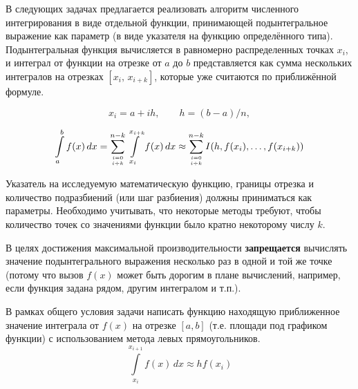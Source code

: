 
В следующих задачах предлагается реализовать алгоритм численного 
интегрирования в виде отдельной функции, принимающей подынтегральное выражение
как параметр (в виде указателя на функцию определённого типа). Подынтегральная 
функция вычисляется в равномерно распределенных точках $x_i$, и интеграл от 
функции на отрезке от $a$ до $b$ представляется как сумма нескольких интегралов 
на отрезках $[x_i,\, x_{i+k}]$, которые уже считаются по приближённой формуле.

\[ x_i = a + i h,\qquad h = (b-a)/n, \]

\[ 
\int\limits_a^b f(x)\,dx = 
\sum_{{i=0} \above 0pt {i\div k}}^{n-k} \int\limits_{x_i}^{x_{i+k}} f(x)\,dx \approx
\sum_{{i=0} \above 0pt {i\div k}}^{n-k} I(h, f(x_i),\dots, f(x_{i+k}))
\]

Указатель на исследуемую математическую функцию, границы отрезка и количество
подразбиений (или шаг разбиения) должны приниматься как параметры. Необходимо 
учитывать, что некоторые методы требуют, чтобы количество точек со значениями 
функции было кратно некоторому числу $k$.

В целях достижения максимальной производительности \textbf{запрещается} вычислять
значение подынтегрального выражения несколько раз в одной и той же точке (потому 
что вызов $f(x)$ может быть дорогим в плане вычислений, например, если функция 
задана рядом, другим интегралом и т.п.).


\begin{zztask}
В рамках общего условия задачи написать функцию находящую приближенное значение 
интеграла от $f(x)$ на отрезке $[a, b]$ (т.е. площади под графиком функции)
с использованием метода левых прямоугольников. 
\[
\int\limits_{x_i}^{x_{i+1}} f(x)\,dx \approx h f(x_i)
\]
\end{zztask}

